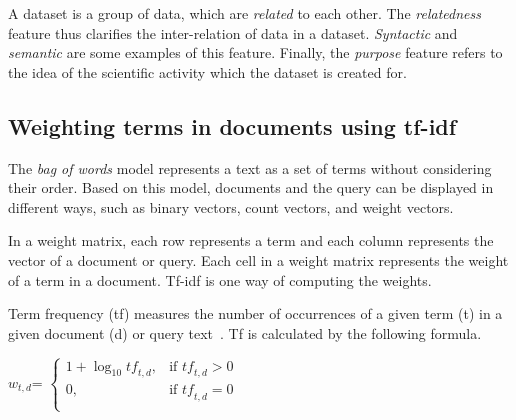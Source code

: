 \documentclass{IOS-Book-Article}
\begin{document}
A dataset is a group of data, which are \emph{related} to each other.
The \emph{relatedness} feature thus clarifies the inter-relation of data in a dataset.
\emph{Syntactic} and \emph{semantic} are some examples of this feature.   
Finally, the \emph{purpose} feature refers to the idea of the scientific activity which the dataset is created for.

\subsection{Weighting terms in documents using tf-idf}
\label{sec:tfidf}
The \emph{bag of words} model represents a text as a set of terms without considering their order.
Based on this model, documents and the query can be displayed in different ways, such as binary vectors, count vectors, and weight vectors.


In a weight matrix, each row represents a term and each column represents the vector of a document or query. Each cell in a weight matrix represents the weight of a term in a document. Tf-idf is one way of computing the weights.

Term frequency (tf) measures the number of occurrences of a given term (t) in a given document (d) or query text~\citep{SALTON1988}. 
Tf is calculated by the following formula. 
\begin{center} 
	$w_{t,d}$=
	$\begin{cases}
	1+\log_{10} \mathit{tf}_{t,d}, & \text{if $\mathit{tf}_{t,d}>0$} \\
	0, & \text{if $\mathit{tf}_{t,d}=0$}\\
	\end{cases}$
\end{center}
\end{document}
